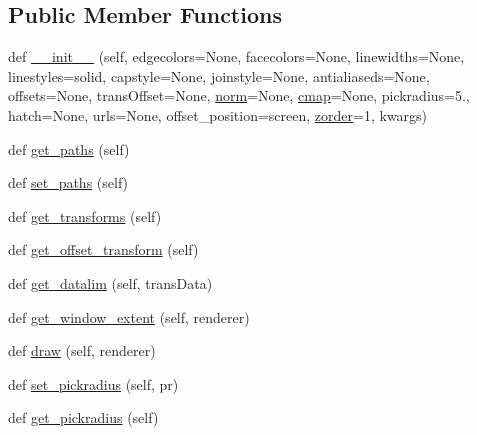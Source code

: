 \subsection*{Public Member Functions}
\begin{DoxyCompactItemize}
\item 
def \hyperlink{classmatplotlib_1_1collections_1_1Collection_a2144120848c8ebd0ba306a9a62c6e1c9}{\+\_\+\+\_\+init\+\_\+\+\_\+} (self, edgecolors=None, facecolors=None, linewidths=None, linestyles=\textquotesingle{}solid\textquotesingle{}, capstyle=None, joinstyle=None, antialiaseds=None, offsets=None, trans\+Offset=None, \hyperlink{classmatplotlib_1_1collections_1_1Collection_a154db555ac4f8bb3d0d342ce30c2f7b1}{norm}=None, \hyperlink{classmatplotlib_1_1collections_1_1Collection_a7f884e899bdd39bd11811fe94920776b}{cmap}=None, pickradius=5., hatch=None, urls=None, offset\+\_\+position=\textquotesingle{}screen\textquotesingle{}, \hyperlink{classmatplotlib_1_1artist_1_1Artist_a210781a1646a5f1e9a1a82bf488c314f}{zorder}=1, kwargs)
\item 
def \hyperlink{classmatplotlib_1_1collections_1_1Collection_ad80230f6890bf3e8e8f8661a0dd333f5}{get\+\_\+paths} (self)
\item 
def \hyperlink{classmatplotlib_1_1collections_1_1Collection_a7e194b19b82d035eb889ced58769284c}{set\+\_\+paths} (self)
\item 
def \hyperlink{classmatplotlib_1_1collections_1_1Collection_aa3e4e16ddc032cd7282e1142492116f3}{get\+\_\+transforms} (self)
\item 
def \hyperlink{classmatplotlib_1_1collections_1_1Collection_af423c2c3a1c29028a9318b5a2a39718b}{get\+\_\+offset\+\_\+transform} (self)
\item 
def \hyperlink{classmatplotlib_1_1collections_1_1Collection_a582677b656f402cf062bc081c97a1c2e}{get\+\_\+datalim} (self, trans\+Data)
\item 
def \hyperlink{classmatplotlib_1_1collections_1_1Collection_affa009f06d8359b1389cc42333346f85}{get\+\_\+window\+\_\+extent} (self, renderer)
\item 
def \hyperlink{classmatplotlib_1_1collections_1_1Collection_a654b54a71ca0414635e6fc6c0d8d03fe}{draw} (self, renderer)
\item 
def \hyperlink{classmatplotlib_1_1collections_1_1Collection_af2875972d17d3f65d06842f7bb1f7367}{set\+\_\+pickradius} (self, pr)
\item 
def \hyperlink{classmatplotlib_1_1collections_1_1Collection_a0cb72b07546485c061dc2fd6256dd2f5}{get\+\_\+pickradius} (self)

\end{DoxyCompactItemize}

